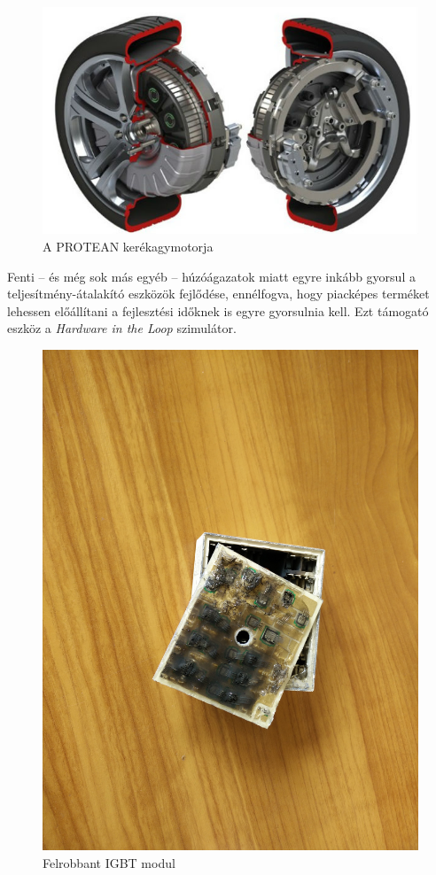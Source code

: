 \begin{figure}[h]
	\centering
	\includegraphics[width = \textwidth]{figures/protean_motor.jpg}
	\caption{A PROTEAN kerékagymotorja} 
	\label{fig:protean}
\end{figure}

Fenti -- és még sok más egyéb -- húzóágazatok miatt egyre inkább gyorsul a teljesítmény-átalakító eszközök fejlődése, ennélfogva, hogy piacképes terméket lehessen előállítani a fejlesztési időknek is egyre gyorsulnia kell. Ezt támogató eszköz a \emph{Hardware in the Loop} szimulátor. 


\begin{figure}[h]
	\centering
	\includegraphics[scale = 0.05]{figures/IMG_20160415_134241.jpg}
	\caption{Felrobbant IGBT modul} 
	\label{fig:blown}
\end{figure}

